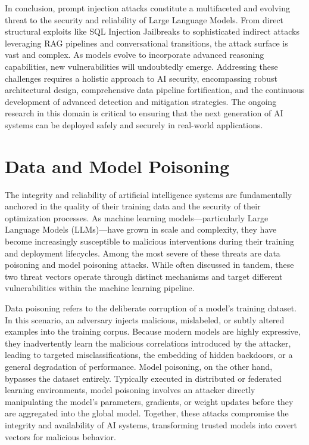 \documentclass[11pt,a4paper]{article}
\begin{document}
In conclusion, prompt injection attacks constitute a multifaceted and evolving threat to the security and reliability of Large Language Models. From direct structural exploits like SQL Injection Jailbreaks to sophisticated indirect attacks leveraging RAG pipelines and conversational transitions, the attack surface is vast and complex. As models evolve to incorporate advanced reasoning capabilities, new vulnerabilities will undoubtedly emerge. Addressing these challenges requires a holistic approach to AI security, encompassing robust architectural design, comprehensive data pipeline fortification, and the continuous development of advanced detection and mitigation strategies. The ongoing research in this domain is critical to ensuring that the next generation of AI systems can be deployed safely and securely in real-world applications.

\section{Data and Model Poisoning}

The integrity and reliability of artificial intelligence systems are fundamentally anchored in the quality of their training data and the security of their optimization processes. As machine learning models---particularly Large Language Models (LLMs)---have grown in scale and complexity, they have become increasingly susceptible to malicious interventions during their training and deployment lifecycles. Among the most severe of these threats are data poisoning and model poisoning attacks. While often discussed in tandem, these two threat vectors operate through distinct mechanisms and target different vulnerabilities within the machine learning pipeline. 

Data poisoning refers to the deliberate corruption of a model's training dataset. In this scenario, an adversary injects malicious, mislabeled, or subtly altered examples into the training corpus. Because modern models are highly expressive, they inadvertently learn the malicious correlations introduced by the attacker, leading to targeted misclassifications, the embedding of hidden backdoors, or a general degradation of performance. Model poisoning, on the other hand, bypasses the dataset entirely. Typically executed in distributed or federated learning environments, model poisoning involves an attacker directly manipulating the model's parameters, gradients, or weight updates before they are aggregated into the global model. Together, these attacks compromise the integrity and availability of AI systems, transforming trusted models into covert vectors for malicious behavior.
\end{document}

